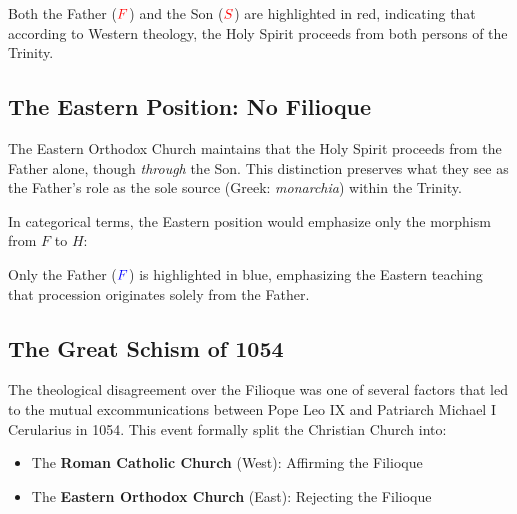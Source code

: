 \documentclass[11pt]{article}
\begin{document}
Both the Father ($\textcolor{red}{F}$) and the Son ($\textcolor{red}{S}$) are highlighted in red, indicating that according to Western theology, the Holy Spirit proceeds from both persons of the Trinity.

\subsection{The Eastern Position: No Filioque}
\label{sec:eastern-no-filioque}

The Eastern Orthodox Church maintains that the Holy Spirit proceeds from the Father alone, though \emph{through} the Son. This distinction preserves what they see as the Father's role as the sole source (Greek: \emph{monarchia}) within the Trinity.

In categorical terms, the Eastern position would emphasize only the morphism from $F$ to $H$:

\begin{center}
\end{center}

Only the Father ($\textcolor{blue}{F}$) is highlighted in blue, emphasizing the Eastern teaching that procession originates solely from the Father.

\subsection{The Great Schism of 1054}
\label{sec:great-schism}

The theological disagreement over the Filioque was one of several factors that led to the mutual excommunications between Pope Leo IX and Patriarch Michael I Cerularius in 1054. This event formally split the Christian Church into:

\begin{itemize}
\item The \textbf{Roman Catholic Church} (West): Affirming the Filioque
\item The \textbf{Eastern Orthodox Church} (East): Rejecting the Filioque
\end{itemize}
\end{document}
